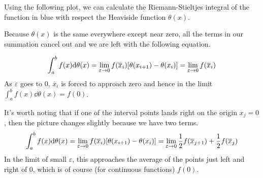 \documentclass[boxes,pages]{homework}
\makeatletter
\numberwithin{@problem}{section}
\makeatother
\begin{document}
\begin{solution}
	Using the following plot, we can calculate the Riemann-Stieltjes integral of the function in blue with respect the Heaviside function $\theta(x)$.
	\begin{figure}[h!]
		\centering
	\end{figure}
	Because $\theta(x)$ is the same everywhere except near zero, all the terms in our summation cancel out and we are left with the following equation.

	\begin{equation*}
		\int_a^bf(x)\dd \theta(x) = \lim_{\varepsilon\to 0}f(\overline{x}_i)\qty[\theta(x_{i+1}) - \theta(x_i)] = \lim_{\varepsilon\to 0}f(\overline{x}_i)
	\end{equation*}
	As $\varepsilon$ goes to 0, $\overline{x}_i$ is forced to approach zero and hence in the limit $\int_a^bf(x)\dd \theta(x) = f(0)$.

	It's worth noting that if one of the interval points lands right on the origin $x_j = 0$, then the picture changes slightly because we have two terms.
	\begin{equation*}
		\int_a^bf(x)\dd \theta(x) = \lim_{\varepsilon\to 0}f(\overline{x}_i)\qty[\theta(x_{i+1}) - \theta(x_i)] = \lim_{\varepsilon\to 0}\frac{1}{2}f(\overline{x}_{j+1}) + \frac{1}{2}f(\overline{x}_j)
	\end{equation*}
	In the limit of small $\varepsilon$, this approaches the average of the points just left and right of 0, which is of course (for continuous functions) $f(0)$.
\end{solution}
\end{document}
